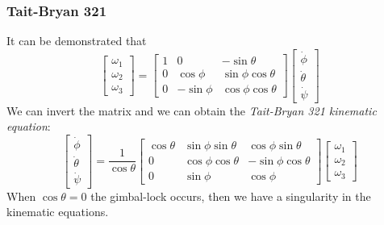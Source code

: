 \subsubsection{Tait-Bryan 321}
It can be demonstrated that
\begin{equation}
        \begin{bmatrix}
            \omega_1\\
            \omega_2\\
            \omega_3
        \end{bmatrix} = 
        \begin{bmatrix}
            1&0&-\sin\theta\\
            0&\cos\phi&\sin\phi\cos\theta\\
            0&-\sin\phi&\cos\phi\cos\theta
        \end{bmatrix}
        \begin{bmatrix}
            \dot{\phi}\\
            \dot{\theta}\\
            \dot{\psi}
        \end{bmatrix}
\end{equation}
We can invert the matrix and we can obtain the \textit{Tait-Bryan 321 kinematic equation}:
\begin{equation}
    \begin{bmatrix}
        \dot{\phi}\\
        \dot{\theta}\\
        \dot{\psi}
    \end{bmatrix}=\frac{1}{\cos\theta}\begin{bmatrix}
        \cos\theta&\sin\phi\sin\theta&\cos\phi\sin\theta\\
        0&\cos\phi\cos\theta&-\sin\phi\cos\theta\\
        0&\sin\phi&\cos\phi
    \end{bmatrix}\begin{bmatrix}
        \omega_1\\
        \omega_2\\
        \omega_3
    \end{bmatrix}
\end{equation}
When $\cos\theta=0$ the gimbal-lock occurs, then we have a singularity in the kinematic equations.

